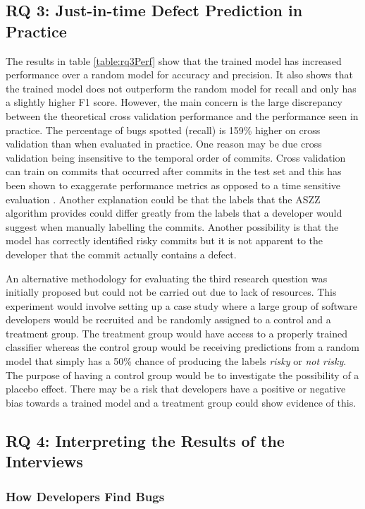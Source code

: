 \documentclass[../main.tex]{subfiles}
\begin{document}
\subsection{RQ 3: Just-in-time Defect Prediction in Practice}

The results in table \ref{table:rq3Perf} show that the trained model has increased performance over a random model for accuracy and precision. It also shows that the trained model does not outperform the random model for recall and only has a slightly higher F1 score. However, the main concern is the large discrepancy between the theoretical cross validation performance and the performance seen in practice. The percentage of bugs spotted (recall) is 159\% higher on cross validation than when evaluated in practice. One reason may be due cross validation being insensitive to the temporal order of commits. Cross validation can train on commits that occurred after commits in the test set and this has been shown to exaggerate performance metrics as opposed to a time sensitive evaluation \cite{tan2015online}. Another explanation could be that the labels that the ASZZ algorithm provides could differ greatly from the labels that a developer would suggest when manually labelling the commits. Another possibility is that the model has correctly identified risky commits but it is not apparent to the developer that the commit actually contains a defect. 

An alternative methodology for evaluating the third research question was initially proposed but could not be carried out due to lack of resources. This experiment would involve setting up a case study where a large group of software developers would be recruited and be randomly assigned to a control and a treatment group. The treatment group would have access to a properly trained classifier whereas the control group would be receiving predictions from a random model that simply has a 50\% chance of producing the labels \textit{risky} or \textit{not risky}. The purpose of having a control group would be to investigate the possibility of a placebo effect. There may be a risk that developers have a positive or negative bias towards a trained model and a treatment group could show evidence of this. 

\subsection{RQ 4: Interpreting the Results of the Interviews}

\subsubsection{How Developers Find Bugs}
\end{document}
